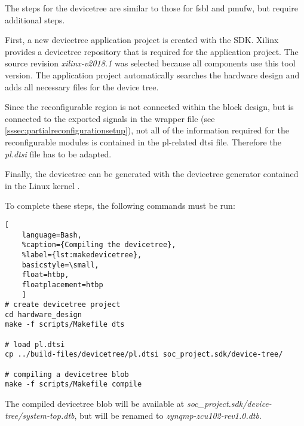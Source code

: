 The steps for the devicetree are similar to those for \gls{fsbl} and \gls{pmufw}, but require additional steps.

First, a new devicetree application project is created with the SDK. Xilinx provides a devicetree repository \cite{devicetree} that is required for the application project. The source revision \emph{xilinx-v2018.1} was selected because all components use this tool version. The application project automatically searches the hardware design and adds all necessary files for the device tree.

Since the reconfigurable region is not connected within the block design, but is connected to the exported signals in the wrapper file (see \cref{sssec:partialreconfigurationsetup}), not all of the information required for the reconfigurable modules is contained in the \gls{pl}-related \gls{dtsi} file. Therefore the \emph{pl.dtsi} file has to be adapted.

Finally, the devicetree can be generated with the devicetree generator contained in the Linux kernel \cite{linuxkernel}.

To complete these steps, the following commands must be run:
\begin{lstlisting}[
	language=Bash,
	%caption={Compiling the devicetree},
	%label={lst:makedevicetree},
	basicstyle=\small,
	float=htbp,
	floatplacement=htbp
	]
# create devicetree project
cd hardware_design
make -f scripts/Makefile dts

# load pl.dtsi
cp ../build-files/devicetree/pl.dtsi soc_project.sdk/device-tree/

# compiling a devicetree blob
make -f scripts/Makefile compile
\end{lstlisting}

The compiled devicetree blob will be available at \emph{soc_project.sdk/device-tree/system-top.dtb}, but will be renamed to \emph{zynqmp-zcu102-rev1.0.dtb}.